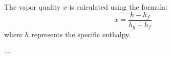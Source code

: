 The vapor quality \( x \) is calculated using the formula:  
\[
x = \frac{h - h_f}{h_g - h_f}
\]  
where \( h \) represents the specific enthalpy.

---